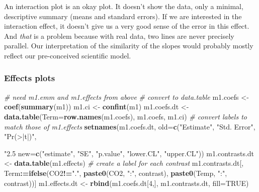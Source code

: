 \documentclass[]{book}
\newenvironment{Shaded}{\begin{snugshade}}{\end{snugshade}}
\newcommand{\CommentTok}[1]{\textcolor[rgb]{0.56,0.35,0.01}{\textit{#1}}}
\newcommand{\DataTypeTok}[1]{\textcolor[rgb]{0.13,0.29,0.53}{#1}}
\newcommand{\DecValTok}[1]{\textcolor[rgb]{0.00,0.00,0.81}{#1}}
\newcommand{\ErrorTok}[1]{\textcolor[rgb]{0.64,0.00,0.00}{\textbf{#1}}}
\newcommand{\KeywordTok}[1]{\textcolor[rgb]{0.13,0.29,0.53}{\textbf{#1}}}
\newcommand{\NormalTok}[1]{#1}
\newcommand{\OperatorTok}[1]{\textcolor[rgb]{0.81,0.36,0.00}{\textbf{#1}}}
\newcommand{\OtherTok}[1]{\textcolor[rgb]{0.56,0.35,0.01}{#1}}
\newcommand{\StringTok}[1]{\textcolor[rgb]{0.31,0.60,0.02}{#1}}
\begin{document}
An interaction plot is an okay plot. It doesn't show the data, only a minimal, descriptive summary (means and standard errors). If we are interested in the interaction effect, it doesn't give us a very good sense of the error in this effect. And \emph{that} is a problem because with real data, two lines are never precisely parallel. Our interpretation of the similarity of the slopes would probably mostly reflect our pre-conceived scientific model.

\hypertarget{effects-plots}{%
\subsubsection{Effects plots}\label{effects-plots}}

\begin{Shaded}
\begin{Highlighting}[]
\CommentTok{# need m1.emm and m1.effects from above}
\CommentTok{# convert to data.table}
\NormalTok{m1.coefs <-}\StringTok{ }\KeywordTok{coef}\NormalTok{(}\KeywordTok{summary}\NormalTok{(m1))}
\NormalTok{m1.ci <-}\StringTok{ }\KeywordTok{confint}\NormalTok{(m1)}
\NormalTok{m1.coefs.dt <-}\StringTok{ }\KeywordTok{data.table}\NormalTok{(}\DataTypeTok{Term=}\KeywordTok{row.names}\NormalTok{(m1.coefs), m1.coefs, m1.ci)}
\CommentTok{# convert labels to match those of m1.effects}
\KeywordTok{setnames}\NormalTok{(m1.coefs.dt, }
         \DataTypeTok{old=}\KeywordTok{c}\NormalTok{(}\StringTok{"Estimate"}\NormalTok{, }\StringTok{"Std. Error"}\NormalTok{, }\StringTok{"Pr(>|t|)"}\NormalTok{, }\StringTok{"2.5 %
         \DataTypeTok{new=}\KeywordTok{c}\NormalTok{(}\StringTok{"estimate"}\NormalTok{, }\StringTok{"SE"}\NormalTok{, }\StringTok{"p.value"}\NormalTok{, }\StringTok{"lower.CL"}\NormalTok{, }\StringTok{"upper.CL"}\NormalTok{))}
\NormalTok{m1.contrasts.dt <-}\StringTok{ }\KeywordTok{data.table}\NormalTok{(m1.effects)}
\CommentTok{# create a label for each contrast}
\NormalTok{m1.contrasts.dt[, Term}\OperatorTok{:}\ErrorTok{=}\KeywordTok{ifelse}\NormalTok{(CO2}\OperatorTok{!=}\StringTok{"."}\NormalTok{, }
                              \KeywordTok{paste0}\NormalTok{(CO2, }\StringTok{":"}\NormalTok{, contrast), }
                              \KeywordTok{paste0}\NormalTok{(Temp, }\StringTok{":"}\NormalTok{, contrast))]}
\NormalTok{m1.effects.dt <-}\StringTok{ }\KeywordTok{rbind}\NormalTok{(m1.coefs.dt[}\DecValTok{4}\NormalTok{,], m1.contrasts.dt, }\DataTypeTok{fill=}\OtherTok{TRUE}\NormalTok{)}

}
\end{Highlighting}
\end{Shaded}
\end{document}
